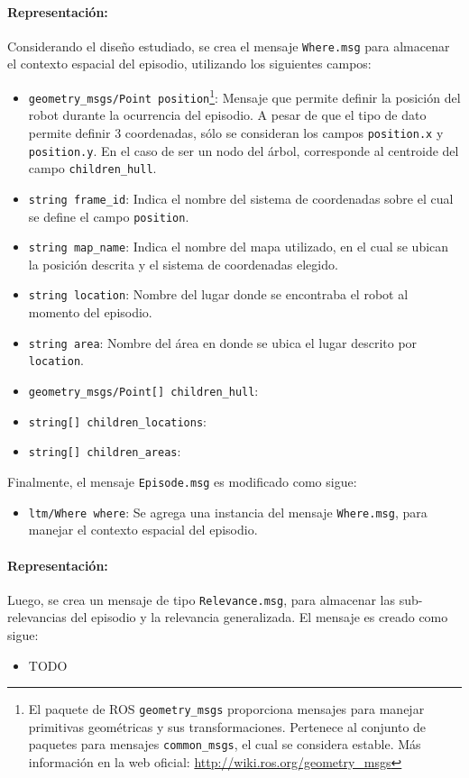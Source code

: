 \paragraph{Representación:}
Considerando el diseño estudiado, se crea el mensaje \texttt{Where.msg} para almacenar el contexto espacial del episodio, utilizando los siguientes campos:
\begin{itemize}
	\item \texttt{geometry\_msgs/Point position}\footnote{El paquete de ROS \texttt{geometry\_msgs} proporciona mensajes para manejar primitivas geométricas y sus transformaciones. Pertenece al conjunto de paquetes para mensajes \texttt{common\_msgs}, el cual se considera estable. Más información en la web oficial: \url{http://wiki.ros.org/geometry\_msgs}}: Mensaje que permite definir la posición del robot durante la ocurrencia del episodio. A pesar de que el tipo de dato permite definir 3 coordenadas, sólo se consideran los campos \texttt{position.x} y \texttt{position.y}. En el caso de ser un nodo del árbol, corresponde al centroide del campo \texttt{children\_hull}.
	\item \texttt{string frame\_id}: Indica el nombre del sistema de coordenadas sobre el cual se define el campo \texttt{position}.
	\item \texttt{string map\_name}: Indica el nombre del mapa utilizado, en el cual se ubican la posición descrita y el sistema de coordenadas elegido. 
	\item \texttt{string location}: Nombre del lugar donde se encontraba el robot al momento del episodio.
	\item \texttt{string area}: Nombre del área en donde se ubica el lugar descrito por \texttt{location}. 
	\item \texttt{geometry\_msgs/Point[] children\_hull}:
	\item \texttt{string[] children\_locations}:
	\item \texttt{string[] children\_areas}:
\end{itemize}

Finalmente, el mensaje \texttt{Episode.msg} es modificado como sigue:
\begin{itemize}
	\item \texttt{ltm/Where where}: Se agrega una instancia del mensaje \texttt{Where.msg}, para manejar el contexto espacial del episodio.
\end{itemize}

\paragraph{Representación:}
Luego, se crea un mensaje de tipo \texttt{Relevance.msg}, para almacenar las sub-relevancias del episodio y la relevancia generalizada. El mensaje es creado como sigue:
\begin{itemize}
	\item TODO
\end{itemize}


